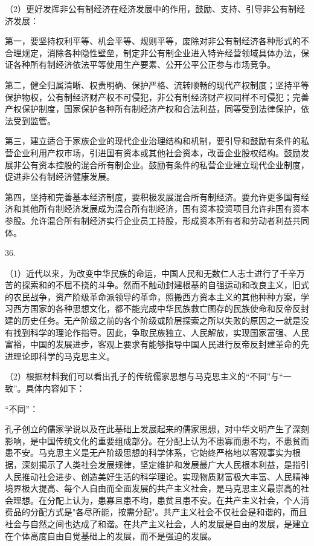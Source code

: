 \documentclass[a4paper]{article}
\begin{document}
（2）更好发挥非公有制经济在经济发展中的作用，鼓励、支持、引导非公有制经济发展：

第一，要坚持权利平等、机会平等、规则平等，废除对非公有制经济各种形式的不合理规定，消除各种隐性壁垒，制定非公有制企业进入特许经营领域具体办法，保证各种所有制经济依法平等使用生产要素、公开公平公正参与市场竞争。

第二，健全归属清晰、权责明确、保护严格、流转顺畅的现代产权制度；坚持平等保护物权，公有制经济财产权不可侵犯，非公有制经济财产权同样不可侵犯；完善产权保护制度，国家保护各种所有制经济产权和合法利益，同等受到法律保护，依法受到监管。

第三，建立适合于家族企业的现代企业治理结构和机制，要引导和鼓励有条件的私营企业利用产权市场，引进国有资本或其他社会资本，改善企业股权结构。鼓励发展非公有资本控股的混合所有制企业。鼓励有条件的私营企业建立现代企业制度，促进非公有制经济健康发展。

第四，坚持和完善基本经济制度，要积极发展混合所有制经济。要允许更多国有经济和其他所有制经济发展成为混合所有制经济，国有资本投资项目允许非国有资本参股。允许混合所有制经济实行企业员工持股，形成资本所有者和劳动者利益共同体。

36.

（1）近代以来，为改变中华民族的命运，中国人民和无数仁人志士进行了千辛万苦的探索和的不屈不挠的斗争。然而不触动封建根基的自强运动和改良主义，旧式的农民战争，资产阶级革命派领导的革命，照搬西方资本主义的其他种种方案，学习西方国家的各种思想文化，都不能完成中华民族救亡图存的民族使命和反帝反封建的历史任务。无产阶级之前的各个阶级或阶层探索之所以失败的原因之一就是没有找到科学的理论作指导。因此，争取民族独立、人民解放，实现国家富强、人民富裕，中国的发展进步，客观上要求有能够指导中国人民进行反帝反封建革命的先进理论即科学的马克思主义。

（2）根据材料我们可以看出孔子的传统儒家思想与马克思主义的“不同”与“一致”。具体内容如下：

“不同”：

孔子创立的儒家学说以及在此基础上发展起来的儒家思想，对中华文明产生了深刻影响，是中国传统文化的重要组成部分。在分配上认为不患寡而患不均，不患贫而患不安。马克思主义是无产阶级思想的科学体系，它始终严格地以客观事实为根据，深刻揭示了人类社会发展规律，坚定维护和发展最广大人民根本利益，是指引人民推动社会进步、创造美好生活的科学理论。实现物质财富极大丰富、人民精神境界极大提高、每个人自由而全面发展的共产主义社会，是马克思主义最崇高的社会理想。在分配上认为，患寡且患不均，患贫且患不安。在共产主义社会，个人消费品的分配方式是"各尽所能，按需分配"。共产主义社会不仅社会是和谐的，而且社会与自然之间也达成了和谐。在共产主义社会，人的发展是自由的发展，是建立在个体高度自由自觉基础上的发展，而不是强迫的发展。
\end{document}
